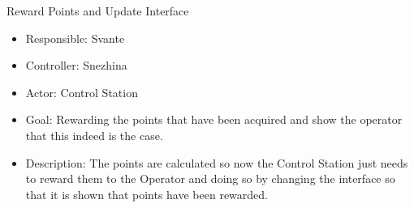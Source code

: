 Reward Points and Update Interface
\begin{itemize}
    \item Responsible: Svante
    \item Controller: Snezhina
    \item Actor: Control Station
    \item Goal: Rewarding the points that have been acquired and show the operator that this indeed is the case. 
    \item Description: The points are calculated so now the Control Station just needs to reward them to the Operator and doing so by changing the interface so that it is shown that points have been rewarded.
\end{itemize}